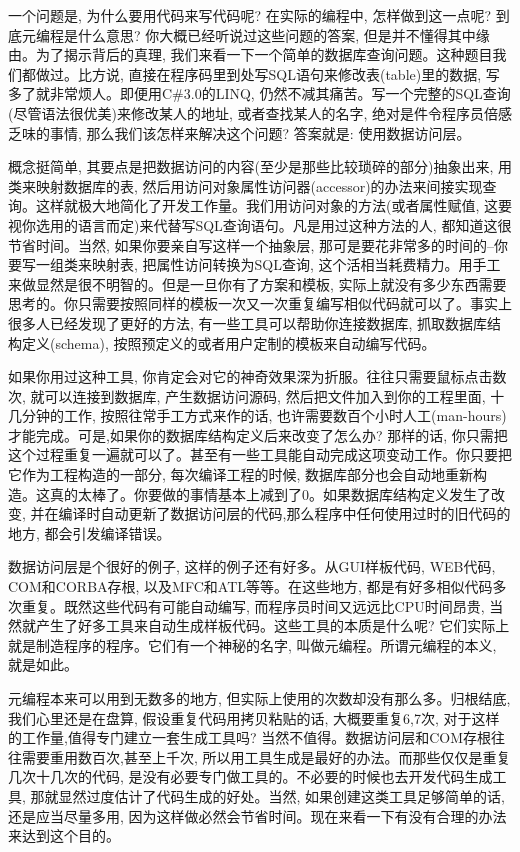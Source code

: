 \documentclass[10pt]{article}
\begin{document}
一个问题是, 为什么要用代码来写代码呢? 在实际的编程中, 怎样做到这一点呢? 到底元编程是什么意思? 你大概已经听说过这些问题的答案, 但是并不懂得其中缘由。为了揭示背后的真理, 我们来看一下一个简单的数据库查询问题。这种题目我们都做过。比方说, 直接在程序码里到处写SQL语句来修改表(table)里的数据, 写多了就非常烦人。即便用C\#3.0的LINQ, 仍然不减其痛苦。写一个完整的SQL查询(尽管语法很优美)来修改某人的地址, 或者查找某人的名字, 绝对是件令程序员倍感乏味的事情, 那么我们该怎样来解决这个问题? 答案就是: 使用数据访问层。 

概念挺简单, 其要点是把数据访问的内容(至少是那些比较琐碎的部分)抽象出来, 用类来映射数据库的表, 然后用访问对象属性访问器(accessor)的办法来间接实现查询。这样就极大地简化了开发工作量。我们用访问对象的方法(或者属性赋值, 这要视你选用的语言而定)来代替写SQL查询语句。凡是用过这种方法的人, 都知道这很节省时间。当然, 如果你要亲自写这样一个抽象层, 那可是要花非常多的时间的--你要写一组类来映射表, 把属性访问转换为SQL查询, 这个活相当耗费精力。用手工来做显然是很不明智的。但是一旦你有了方案和模板, 实际上就没有多少东西需要思考的。你只需要按照同样的模板一次又一次重复编写相似代码就可以了。事实上很多人已经发现了更好的方法, 有一些工具可以帮助你连接数据库, 抓取数据库结构定义(schema), 按照预定义的或者用户定制的模板来自动编写代码。

如果你用过这种工具, 你肯定会对它的神奇效果深为折服。往往只需要鼠标点击数次, 就可以连接到数据库, 产生数据访问源码, 然后把文件加入到你的工程里面, 十几分钟的工作, 按照往常手工方式来作的话, 也许需要数百个小时人工(man-hours)才能完成。可是,如果你的数据库结构定义后来改变了怎么办? 那样的话, 你只需把这个过程重复一遍就可以了。甚至有一些工具能自动完成这项变动工作。你只要把它作为工程构造的一部分, 每次编译工程的时候, 数据库部分也会自动地重新构造。这真的太棒了。你要做的事情基本上减到了0。如果数据库结构定义发生了改变, 并在编译时自动更新了数据访问层的代码,那么程序中任何使用过时的旧代码的地方, 都会引发编译错误。

数据访问层是个很好的例子, 这样的例子还有好多。从GUI样板代码, WEB代码, COM和CORBA存根, 以及MFC和ATL等等。在这些地方, 都是有好多相似代码多次重复。既然这些代码有可能自动编写, 而程序员时间又远远比CPU时间昂贵, 当然就产生了好多工具来自动生成样板代码。这些工具的本质是什么呢? 它们实际上就是制造程序的程序。它们有一个神秘的名字, 叫做元编程。所谓元编程的本义, 就是如此。

元编程本来可以用到无数多的地方, 但实际上使用的次数却没有那么多。归根结底, 我们心里还是在盘算, 假设重复代码用拷贝粘贴的话, 大概要重复6,7次, 对于这样的工作量,值得专门建立一套生成工具吗? 当然不值得。数据访问层和COM存根往往需要重用数百次,甚至上千次, 所以用工具生成是最好的办法。而那些仅仅是重复几次十几次的代码, 是没有必要专门做工具的。不必要的时候也去开发代码生成工具, 那就显然过度估计了代码生成的好处。当然, 如果创建这类工具足够简单的话, 还是应当尽量多用, 因为这样做必然会节省时间。现在来看一下有没有合理的办法来达到这个目的。
\end{document}
